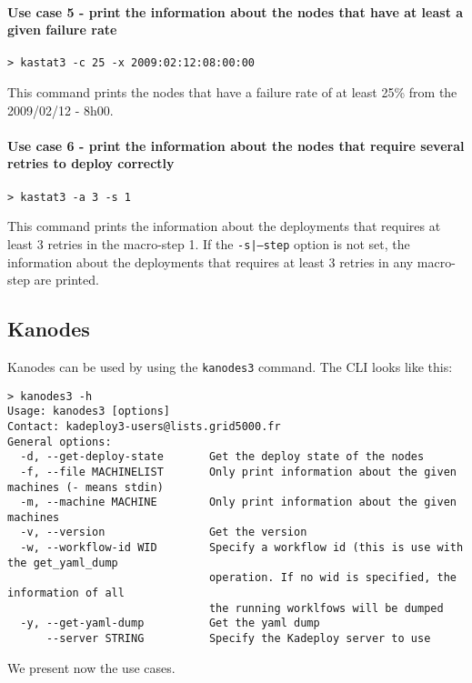 \documentclass[a4wide,10pt,oneside]{book}
\begin{document}
\paragraph{Use case 5 - print the information about the nodes that have at least a given failure rate}
\begin{verbatim}
> kastat3 -c 25 -x 2009:02:12:08:00:00
\end{verbatim}
This command prints the nodes that have a failure rate of at least 25\% from the 2009/02/12 - 8h00.

\paragraph{Use case 6 - print the information about the nodes that require several retries to deploy correctly}
\begin{verbatim}
> kastat3 -a 3 -s 1
\end{verbatim}
This command prints the information about the deployments that requires at least 3 retries in the macro-step 1. If the \texttt{-s|--step} option is not set, the information about the deployments that requires at least 3 retries in any macro-step are printed.


\subsection{Kanodes}\label{sec:kanodes}
Kanodes can be used by using the \texttt{kanodes3} command. The CLI looks like this:
\begin{small}
\begin{verbatim}
> kanodes3 -h
Usage: kanodes3 [options]
Contact: kadeploy3-users@lists.grid5000.fr
General options:
  -d, --get-deploy-state       Get the deploy state of the nodes
  -f, --file MACHINELIST       Only print information about the given machines (- means stdin)
  -m, --machine MACHINE        Only print information about the given machines
  -v, --version                Get the version
  -w, --workflow-id WID        Specify a workflow id (this is use with the get_yaml_dump 
                               operation. If no wid is specified, the information of all
                               the running worklfows will be dumped
  -y, --get-yaml-dump          Get the yaml dump
      --server STRING          Specify the Kadeploy server to use
\end{verbatim}
\end{small}

We present now the use cases.
\end{document}
